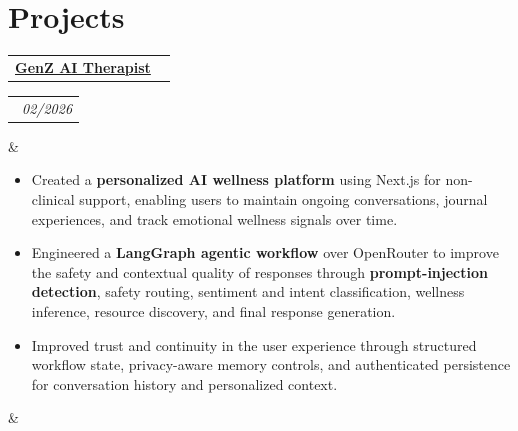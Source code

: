 \documentclass[11pt,a4paper,sans]{moderncv}
\makeatletter
\newcommand*{\customcventry}[7][.13em]{
\begin{tabular}{@{}l}
{\bfseries #4} \
{\itshape #3}
\end{tabular}
\hfill
\begin{tabular}{l@{}}
{\bfseries #5} \
{\itshape #2}
\end{tabular}
\ifx&#7&%
\else{\
\begin{minipage}{\maincolumnwidth}%
\small#7%
\end{minipage}}\fi%
\par\addvspace{#1}}
\makeatother
\begin{document}
\section{Projects}
\customcventry{02/2026}{}{\href{https://github.com/Koushik0901/GenZ-AI-Therapist/tree/main}{GenZ AI Therapist\enspace\faGithub}}{}{}{
	\vspace{4pt}
	\begin{itemize}[leftmargin=0.6cm, label={\textbullet}]
        \item Created a \textbf{personalized AI wellness platform} using Next.js for non-clinical support, enabling users to maintain ongoing conversations, journal experiences, and track emotional wellness signals over time.
        \vspace{-2pt}
        \item Engineered a \textbf{LangGraph agentic workflow} over OpenRouter to improve the safety and contextual quality of responses through \textbf{prompt-injection detection}, safety routing, sentiment and intent classification, wellness inference, resource discovery, and final response generation.
        \vspace{-2pt}
        \item Improved trust and continuity in the user experience through structured workflow state, privacy-aware memory controls, and authenticated persistence for conversation history and personalized context.
\end{itemize}
}
\vspace{10pt}
\end{document}

